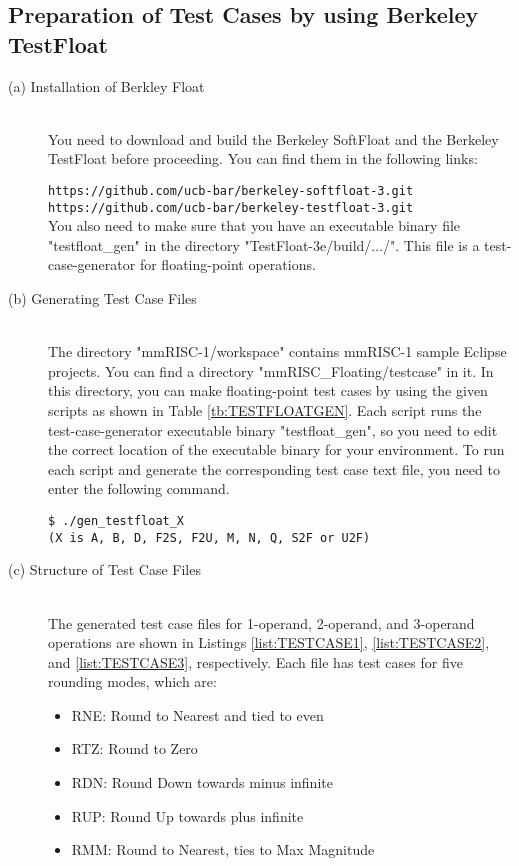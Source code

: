 \subsection{Preparation of Test Cases by using Berkeley TestFloat}
\begin{description}

    \item[(a) Installation of Berkley Float]\mbox{}\\
You need to download and build the Berkeley SoftFloat and the Berkeley TestFloat before proceeding. You can find them in the following links:

\texttt{https://github.com/ucb-bar/berkeley-softfloat-3.git\\
        https://github.com/ucb-bar/berkeley-testfloat-3.git}\\

You also need to make sure that you have an executable binary file "testfloat\_gen" in the directory "TestFloat-3e/build/.../". This file is a test-case-generator for floating-point operations.\\


    \item[(b) Generating Test Case Files]\mbox{}\\
The directory "mmRISC-1/workspace" contains mmRISC-1 sample Eclipse projects. You can find a directory "mmRISC\_Floating/testcase" in it. In this directory, you can make floating-point test cases by using the given scripts as shown in Table \ref{tb:TESTFLOATGEN}. Each script runs the test-case-generator executable binary "testfloat\_gen", so you need to edit the correct location of the executable binary for your environment. To run each script and generate the corresponding test case text file, you need to enter the following command.    
    
\texttt{\$ ./gen\_testfloat\_X \\(X is A, B, D, F2S, F2U, M, N, Q, S2F or U2F)}

    \item[(c) Structure of Test Case Files]\mbox{}\\
The generated test case files for 1-operand, 2-operand, and 3-operand operations are shown in Listings \ref{list:TESTCASE1}, \ref{list:TESTCASE2}, and \ref{list:TESTCASE3}, respectively. Each file has test cases for five rounding modes, which are:

    
\begin{itemize}
    \item RNE: Round to Nearest and tied to even
    \item RTZ: Round to Zero
    \item RDN: Round Down towards minus infinite
    \item RUP: Round Up towards plus infinite
    \item RMM: Round to Nearest, ties to Max Magnitude
\end{itemize}


\end{description}
